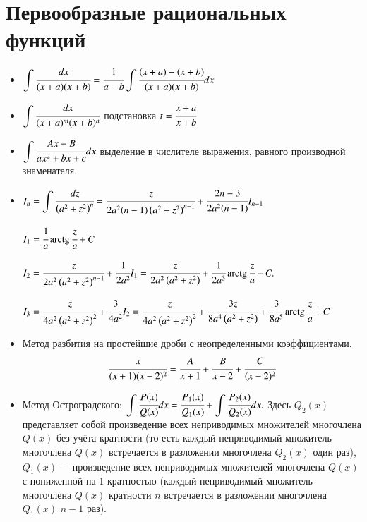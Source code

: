 \documentclass[twoside, a4paperpt]{extarticle}
\begin{document}
\section*{Первообразные рациональных функций}
\begin{itemize}
    \item $ \displaystyle \int \cfrac{d x}{(x+a)(x+b)}=\cfrac{1}{a-b} \displaystyle \int \cfrac{(x+a)-(x+b)}{(x+a)(x+b)} d x $
    \item $ \displaystyle \int \cfrac{d x}{(x+a)^{m}(x+b)^{n}}$ подстановка $ t=\cfrac{x+a}{x+b} $
    \item $ \displaystyle \int \cfrac{A x+B}{a x^{2}+b x+c} d x$ выделение в числителе выражения,  равного производной знаменателя.
    \item $I_{n}=\displaystyle \int \cfrac{d z}{\left(a^{2}+z^{2}\right)^{n}} = \cfrac{z}{2 a^{2}(n-1)\left(a^{2}+z^{2}\right)^{n-1}}+\cfrac{2 n-3}{2 a^{2}(n-1)} I_{n-1}$
    
    $I_{1}=\cfrac{1}{a} \operatorname{arctg} \cfrac{z}{a}+C$
    
    $I_{2}=\cfrac{z}{2 a^{2}\left(a^{2}+z^{2}\right)^{n-1}}+\cfrac{1}{2 a^{2}} I_{1}=\cfrac{z}{2 a^{2}\left(a^{2}+z^{2}\right)}+\cfrac{1}{2 a^{3}} \operatorname{arctg} \cfrac{z}{a}+C .$
    
    $I_{3}=\cfrac{z}{4 a^{2}\left(a^{2}+z^{2}\right)^{2}}+\cfrac{3}{4 a^{2}} I_{2}=\cfrac{z}{4 a^{2}\left(a^{2}+z^{2}\right)^{2}}+\cfrac{3 z}{8 a^{4}\left(a^{2}+z^{2}\right)}+\cfrac{3}{8 a^{5}} \operatorname{arctg} \cfrac{z}{a}+C$

    \item Метод разбития на простейшие дроби с неопределенными коэффициентами.
    $$\cfrac{x}{(x+1)(x-2)^{2}}=\cfrac{A}{x+1}+\cfrac{B}{x-2}+\cfrac{C}{(x-2)^{2}}$$
    \newpage
    \item Метод Остроградского: $\displaystyle \int \cfrac{P(x)}{Q(x)} d x=\cfrac{P_{1}(x)}{Q_{1}(x)}+\displaystyle \int \cfrac{P_{2}(x)}{Q_{2}(x)} d x .$
    Здесь $Q_{2}(x)$ представляет собой произведение всех неприводимых множителей многочлена $Q(x)$ без учёта кратности (то есть каждый неприводимый множитель многочлена $Q(x)$ встречается в разложении многочлена $Q_{2}(x)$ один раз), $Q_{1}(x)-$ произведение всех неприводимых множителей многочлена $Q(x)$ с пониженной на 1 кратностью (каждый неприводимый множитель многочлена $Q(x)$ кратности $n$ встречается в разложении многочлена $Q_{1}(x)$ $n-1$ раз).
\end{itemize}
\end{document}
